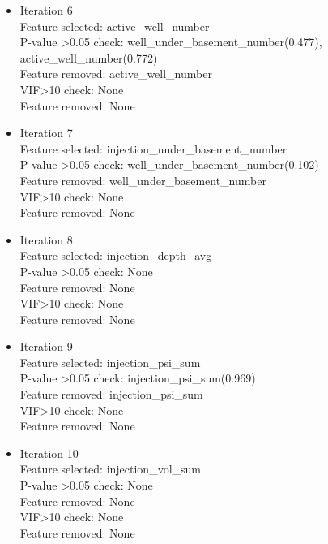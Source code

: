\documentclass[final-report]{report-template}
\begin{document}
\begin{itemize}
\item Iteration 6\\
Feature selected: active\_well\_number\\
P-value \textgreater 0.05 check:  well\_under\_basement\_number(0.477), active\_well\_number(0.772)\\
Feature removed: active\_well\_number\\
VIF\textgreater 10 check: None\\
Feature removed: None\\

\item Iteration 7\\
Feature selected: injection\_under\_basement\_number\\
P-value \textgreater 0.05 check: well\_under\_basement\_number(0.102)\\
Feature removed: well\_under\_basement\_number\\
VIF\textgreater 10 check: None\\
Feature removed: None\\

\item Iteration 8\\
Feature selected: injection\_depth\_avg\\
P-value \textgreater 0.05 check: None\\
Feature removed: None\\
VIF\textgreater 10 check: None\\
Feature removed: None\\

\item Iteration 9\\
Feature selected: injection\_psi\_sum\\
P-value \textgreater 0.05 check: injection\_psi\_sum(0.969)\\
Feature removed: injection\_psi\_sum\\
VIF\textgreater 10 check: None\\
Feature removed: None\\

\item Iteration 10\\
Feature selected: injection\_vol\_sum\\
P-value \textgreater 0.05 check: None\\
Feature removed: None\\
VIF\textgreater 10 check: None\\
Feature removed: None\\
\end{itemize}
\end{document}
